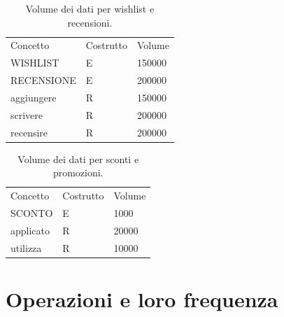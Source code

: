 \documentclass[a4paper,12pt]{report}
\begin{document}
	\begin{table}[H]
		\centering
		\begin{tabular}{|lll|}
			\hline
			\rowcolor[HTML]{FFCE93}
			\multicolumn{3}{|l|}{\cellcolor[HTML]{FFCE93}Wishlist e Recensioni} \\ \hline
			\rowcolor[HTML]{CBCEFB}
			Concetto          & Costrutto & Volume           \\ \hline
			WISHLIST          & E         & 150000           \\ \hline
			RECENSIONE        & E         & 200000           \\ \hline
			aggiungere        & R         & 150000           \\ \hline
			scrivere          & R         & 200000           \\ \hline
			recensire         & R         & 200000           \\ \hline
		\end{tabular}
		\caption{Volume dei dati per wishlist e recensioni.}
	\end{table}
	
	\begin{table}[H]
		\centering
		\begin{tabular}{|lll|}
			\hline
			\rowcolor[HTML]{FFCE93}
			\multicolumn{3}{|l|}{\cellcolor[HTML]{FFCE93}Sconti e Promozioni} \\ \hline
			\rowcolor[HTML]{CBCEFB}
			Concetto          & Costrutto & Volume           \\ \hline
			SCONTO            & E         & 1000             \\ \hline
			applicato         & R         & 20000            \\ \hline
			utilizza          & R         & 10000            \\ \hline
		\end{tabular}
		\caption{Volume dei dati per sconti e promozioni.}
	\end{table}
	\section{Operazioni e loro frequenza}
\end{document}
